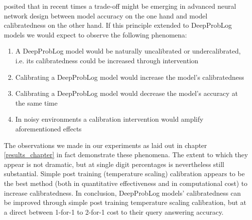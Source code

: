 \cite{guo2017calibration} posited that in recent times a trade-off might be emerging in advanced neural network design between model accuracy on the one hand and model calibratedness on the other hand. If this principle extended to DeepProbLog models we would expect to observe the following phenomena:
\begin{enumerate}
  \item A DeepProbLog model would be naturally uncalibrated or undercalibrated, i.e. its calibratedness could be increased through intervention
  \item Calibrating a DeepProbLog model would increase the model's calibratedness
  \item Calibrating a DeepProbLog model would decrease the model's accuracy at the same time
  \item In noisy environments a calibration intervention would amplify aforementioned effects
\end{enumerate}
The observations we made in our experiments as laid out in chapter \ref{results_chapter} in fact demonstrate these phenomena. The extent to which they appear is not dramatic, but at single digit percentages is nevertheless still substantial. Simple post training (temperature scaling) calibration appears to be the best method (both in quantitative effectiveness and in computational cost) to increase calibratedness.
In conclusion, DeepProbLog models' calibratedness can be improved through simple post training temperature scaling calibration, but at a direct between 1-for-1 to 2-for-1 cost to their query answering accuracy.